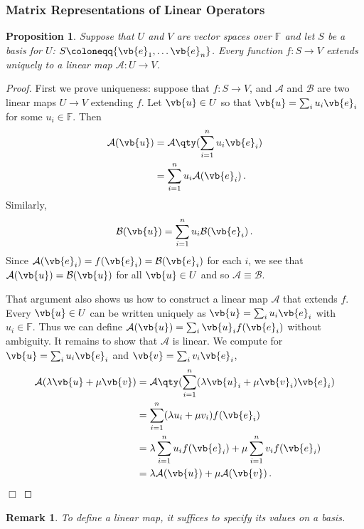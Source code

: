 \documentclass{article}
\theoremstyle{plain}\theoremheaderfont{\normalfont\itshape}\theorembodyfont{\rmfamily}\theoremseparator{.}\newtheorem*{rem}{Remark}\newtheorem*{ex}{Example}\newtheorem*{proof}{Proof}\newtheorem*{altp}{Alternative proof}
\theoremstyle{plain}\theoremheaderfont{\normalfont\bfseries}\theorembodyfont{\rmfamily}\theoremseparator{.}\newtheorem{thm}{Theorem}[section]\newtheorem{lem}[thm]{Lemma}\newtheorem{prop}[thm]{Proposition}\newtheorem*{cor}{Corollary}\newtheorem{defn}[thm]{Definition}\newtheorem{clm}[thm]{Claim}\newtheorem{clminproof}{Claim}
\theoremstyle{break}\theoremheaderfont{\normalfont\itshape}\theorembodyfont{\rmfamily}\theoremseparator{.\medskip}\newtheorem*{proofskip}{Proof}\newtheorem*{exs}{Examples}\newtheorem*{rems}{Remarks}
\theoremstyle{break}\theoremheaderfont{\normalfont\bfseries}\theorembodyfont{\rmfamily}\theoremseparator{.\medskip}\newtheorem{lemskip}[thm]{Lemma}\newtheorem{defnskip}[thm]{Definition}\newtheorem{propskip}[thm]{Proposition}\newtheorem{thmskip}[thm]{Theorem}
\numberwithin{equation}{section}
\newcommand{\qed}{\hfill\ensuremath{\Box}}
\begin{document}
	\subsubsection{Matrix Representations of Linear Operators}
	\begin{prop}
		Suppose that \(U\) and \(V\) are vector spaces over \(\mathbb{F}\) and let \(S\) be a basis for \(U\): \(S\coloneqq\{\vb{e}_1,\dots\vb{e}_n\}\). Every function \(f:S\to V\) extends uniquely to a linear map \(\mathcal{A}:U\to V\). 
	\end{prop}
	\begin{proof}
		First we prove uniqueness: suppose that \(f:S\to V\), and \(\mathcal{A}\) and \(\mathcal{B}\) are two linear maps \(U\to V\) extending \(f\). Let \(\vb{u}\in U\) so that \(\vb{u}=\sum_i u_i\vb{e}_i\) for some \(u_i\in\mathbb{F}\). Then
		\begin{align*}
			\mathcal{A}(\vb{u})&=\mathcal{A}\qty(\sum_{i=1}^{n} u_i\vb{e}_i)\\
			&=\sum_{i=1}^{n}u_i\mathcal{A}(\vb{e}_i)\,.
		\end{align*}
		Similarly,
		\[\mathcal{B}(\vb{u})=\sum_{i=1}^{n}u_i\mathcal{B}(\vb{e}_i)\,.\]
		Since \(\mathcal{A}(\vb{e}_i)=f(\vb{e}_i)=\mathcal{B}(\vb{e}_i)\) for each \(i\), we see that \(\mathcal{A}(\vb{u})=\mathcal{B}(\vb{u})\) for all \(\vb{u}\in U\) and so \(\mathcal{A}\equiv\mathcal{B}\).

		That argument also shows us how to construct a linear map \(\mathcal{A}\) that extends \(f\). Every \(\vb{u}\in U\) can be written uniquely as \(\vb{u}=\sum_i u_i\vb{e}_i\) with \(u_i\in\mathbb{F}\). Thus we can define \(\mathcal{A}(\vb{u})=\sum_i \vb{u}_if(\vb{e}_i)\) without ambiguity. It remains
		to show that \(\mathcal{A}\) is linear. We compute for \(\vb{u}=\sum_i u_i\vb{e}_i\) and \(\vb{v}=\sum_i v_i\vb{e}_i\),
		\begin{align*}
			\mathcal{A}(\lambda\vb{u}+\mu\vb{v})&=\mathcal{A}\qty(\sum_{i=1}^{n}(\lambda\vb{u}_i+\mu\vb{v}_i)\vb{e}_i)\\
			&=\sum_{i=1}^{n}(\lambda u_i+\mu v_i)f(\vb{e}_i)\\
			&=\lambda\sum_{i=1}^{n}u_if(\vb{e}_i)+\mu\sum_{i=1}^{n}v_if(\vb{e}_i)\\
			&=\lambda\mathcal{A}(\vb{u})+\mu\mathcal{A}(\vb{v})\,.
		\end{align*}\qed
	\end{proof}
	\begin{rem}
		To define a linear map, it suffices to specify its values on a basis.
	\end{rem}
\end{document}
